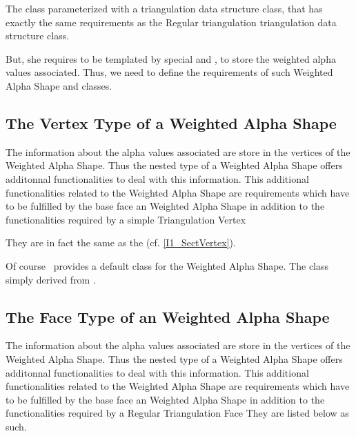 The class  parameterized with a
triangulation data structure class, that has exactly the same
requirements as the Regular triangulation triangulation data
structure class. 

But, she requires to be templated by special  and
, to store the weighted alpha values associated. Thus, we need to
define the requirements of such Weighted Alpha Shape  and
 classes.

\subsection{The Vertex Type of a Weighted Alpha Shape} 

The information about the alpha values associated  are store in the 
vertices of the Weighted Alpha Shape. Thus the nested 
type of a Weighted Alpha Shape offers additonnal functionalities to deal with this information.
This additional functionalities related to the Weighted Alpha Shape
are requirements which have to be fulfilled
by the base face  an Weighted Alpha Shape
in addition to the functionalities required by a simple Triangulation Vertex

They are in fact the same as the 
(cf. \ref{I1_SectVertex}).

Of course  \cgal\ provides a default  class
for the Weighted Alpha Shape. The class
 simply derived from 
.


\subsection{The Face Type of an Weighted Alpha Shape} 

The information about the alpha values associated  are store in the 
vertices of the Weighted Alpha Shape. Thus the nested 
type of a Weighted Alpha Shape offers additonnal functionalities to deal with this information.
This additional functionalities related to the Weighted Alpha Shape
are requirements which have to be fulfilled
by the base face  an Weighted Alpha Shape
in addition to the functionalities required by a Regular Triangulation Face
They are listed below as such.




